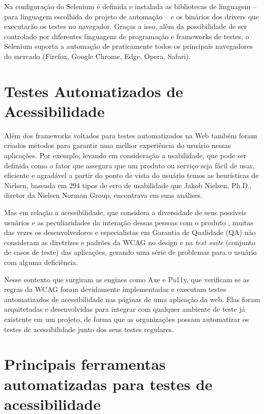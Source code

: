 \documentclass[
	12pt,				%
	openright,			%
	oneside,			%
	a4paper,			%
	chapter=TITLE,		%
	section=TITLE,		%
	subsection=TITLE,	%
	subsubsection=TITLE,%
	english,			%
	brazil				%
	]{abntex2}
\theoremstyle{definition}
\begin{document}
Na configuração do Selenium é definida e instalada as bibliotecas de linguagem – para linguagem escolhida do projeto de automação – e os binários dos drivers que executarão os testes no navegador. Graças a isso, além da possibilidade de ser controlado por diferentes linguagens de programação e frameworks de testes, o Selenium suporta a automação de praticamente todos os principais navegadores do mercado (Firefox, Google Chrome, Edge, Opera, Safari).

\section{Testes Automatizados de Acessibilidade}

Além dos frameworks voltados para testes automatizados na Web  também foram criados métodos para garantir uma melhor experiência do usuário nessas aplicações. Por exemplo, levando em consideração a usabilidade, que pode ser definida como o fator que assegura que um produto ou serviço seja fácil de usar, eficiente e agradável a partir do ponto de vista do usuário \cite{sharp2005design} temos as heurísticas de Nielsen, baseada em 294 tipos de erro de usabilidade que Jakob Nielsen, Ph.D., diretor da Nielsen Norman Group, encontrava em suas análises.

Mas em relação a acessibilidade, que considera a diversidade de seus possíveis usuários e as peculiaridades da interação dessas pessoas com o produto \cite{torres2004conteudos}, muitas das vezes os desenvolvedores e especialistas em Garantia de Qualidade (QA) não consideram as diretrizes e padrões da WCAG no design e na \textit{test suite} (conjunto de casos de teste) das aplicações, gerando uma série de problemas para o usuário com alguma deficiência.

Nesse contexto que surgiram as engines como Axe e Pa11y, que verificam se as regras da WCAG foram devidamente implementadas e executam testes automatizados de acessibilidade nas páginas de uma aplicação da web. Elas foram arquitetadas e desenvolvidas para integrar com qualquer ambiente de teste já existente em um projeto, de forma que as organizações possam automatizar os testes de acessibilidade junto dos seus testes regulares.

\section{Principais ferramentas automatizadas para testes de acessibilidade}

\end{document}
